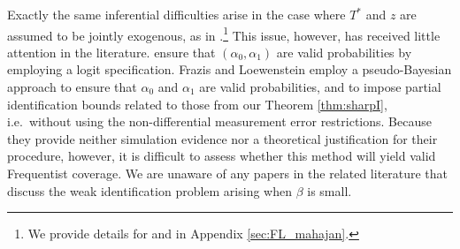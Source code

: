 Exactly the same inferential difficulties arise in the case where $T^*$ and $z$ are assumed to be jointly exogenous, as in \cite{KRS,BBS,FL,Mahajan,Lewbel}.\footnote{We provide details for \cite{FL} and \cite{Mahajan} in Appendix \ref{sec:FL_mahajan}.}
This issue, however, has received little attention in the literature. 
\cite{KRS} ensure that $(\alpha_0, \alpha_1)$ are valid probabilities by employing a logit specification.
Frazis and Loewenstein employ a pseudo-Bayesian approach to ensure that $\alpha_0$ and $\alpha_1$ are valid probabilities, and to impose partial identification bounds related to those from our Theorem \ref{thm:sharpI}, i.e.\ without using the non-differential measurement error restrictions.
Because they provide neither simulation evidence nor a theoretical justification for their procedure, however, it is difficult to assess whether this method will yield valid Frequentist coverage.
We are unaware of any papers in the related literature that discuss the weak identification problem arising when $\beta$ is small.


